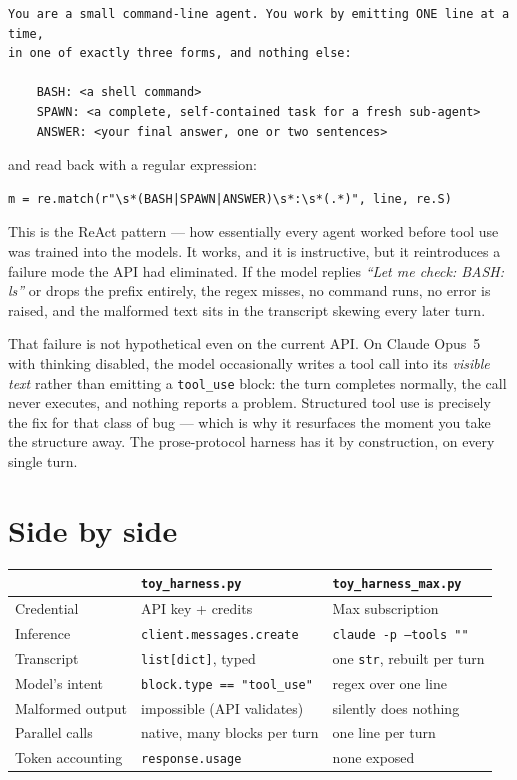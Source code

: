 \documentclass[11pt,a4paper]{article}
\newcommand{\code}[1]{\texttt{#1}}
\begin{document}
\begin{lstlisting}
You are a small command-line agent. You work by emitting ONE line at a time,
in one of exactly three forms, and nothing else:

    BASH: <a shell command>
    SPAWN: <a complete, self-contained task for a fresh sub-agent>
    ANSWER: <your final answer, one or two sentences>
\end{lstlisting}

and read back with a regular expression:

\begin{lstlisting}[style=py]
m = re.match(r"\s*(BASH|SPAWN|ANSWER)\s*:\s*(.*)", line, re.S)
\end{lstlisting}

This is the ReAct pattern --- how essentially every agent worked before tool
use was trained into the models. It works, and it is instructive, but it
reintroduces a failure mode the API had eliminated. If the model replies
\emph{``Let me check: BASH: ls''} or drops the prefix entirely, the regex
misses, no command runs, no error is raised, and the malformed text sits in the
transcript skewing every later turn.

That failure is not hypothetical even on the current API. On Claude Opus~5 with
thinking disabled, the model occasionally writes a tool call into its
\emph{visible text} rather than emitting a \code{tool\_use} block: the turn
completes normally, the call never executes, and nothing reports a problem.
Structured tool use is precisely the fix for that class of bug --- which is why
it resurfaces the moment you take the structure away. The prose-protocol
harness has it by construction, on every single turn.

\section{Side by side}

\begin{table}[h]
\centering
\begin{tabular}{@{}lll@{}}
\toprule
& \code{toy\_harness.py} & \code{toy\_harness\_max.py} \\
\midrule
Credential      & API key + credits            & Max subscription \\
Inference       & \code{client.messages.create} & \code{claude -p --tools ""} \\
Transcript      & \code{list[dict]}, typed      & one \code{str}, rebuilt per turn \\
Model's intent  & \code{block.type == "tool\_use"} & regex over one line \\
Malformed output& impossible (API validates)    & silently does nothing \\
Parallel calls  & native, many blocks per turn  & one line per turn \\
Token accounting& \code{response.usage}         & none exposed \\
\bottomrule
\end{tabular}
\end{table}
\end{document}
